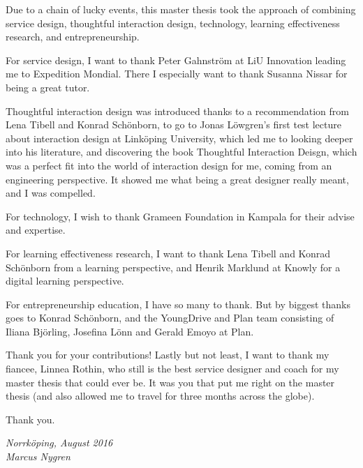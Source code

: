 \begin{acknowledgments}

  Due to a chain of lucky events, this master thesis took the approach of combining service design, thoughtful interaction design, technology, learning effectiveness research, and entrepreneurship.

For service design, I want to thank Peter Gahnström at LiU Innovation leading me to Expedition Mondial. There I especially want to thank Susanna Nissar for being a great tutor.

Thoughtful interaction design was introduced thanks to a recommendation from Lena Tibell and Konrad Schönborn, to go to Jonas Löwgren's first test lecture about interaction design at Linköping University, which led me to looking deeper into his literature, and discovering the book Thoughtful Interaction Deisgn, which was a perfect fit into the world of interaction design for me, coming from an engineering perspective. It showed me what being a great designer really meant, and I was compelled.

For technology, I wish to thank Grameen Foundation in Kampala for their advise and expertise.

For learning effectiveness research, I want to thank Lena Tibell and Konrad Schönborn from a learning perspective, and Henrik Marklund at Knowly for a digital learning perspective.

For entrepreneurship education, I have so many to thank. But by biggest thanks goes to Konrad Schönborn, and the YoungDrive and Plan team consisting of Iliana Björling, Josefina Lönn and Gerald Emoyo at Plan.

Thank you for your contributions! Lastly but not least, I want to thank my fiancee, Linnea Rothin, who still is the best service designer and coach for my master thesis that could ever be. It was you that put me right on the master thesis (and also allowed me to travel for three months across the globe).

Thank you.


  \addvspace{1em}
  \begin{flushright}
    \textit{%
      Norrköping, August 2016\\
      Marcus Nygren%
    }
  \end{flushright}
\end{acknowledgments}
